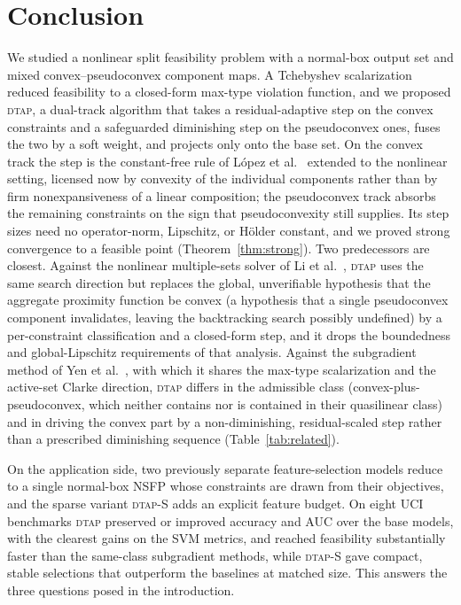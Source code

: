 \documentclass[]{interact}
\theoremstyle{plain}
\theoremstyle{definition}
\theoremstyle{remark}
\newcommand{\dtap}{\textsc{dtap}}
\begin{document}
\section{Conclusion}\label{sec:conclusion}
We studied a nonlinear split feasibility problem with a normal-box output set and mixed convex--pseudoconvex component maps. A Tchebyshev scalarization reduced feasibility to a closed-form max-type violation function, and we proposed \dtap, a dual-track algorithm that takes a residual-adaptive step on the convex constraints and a safeguarded diminishing step on the pseudoconvex ones, fuses the two by a soft weight, and projects only onto the base set. On the convex track the step is the constant-free rule of L\'opez et al.~\citep{lopez2012} extended to the nonlinear setting, licensed now by convexity of the individual components rather than by firm nonexpansiveness of a linear composition; the pseudoconvex track absorbs the remaining constraints on the sign that pseudoconvexity still supplies. Its step sizes need no operator-norm, Lipschitz, or H\"older constant, and we proved strong convergence to a feasible point (Theorem~\ref{thm:strong}). Two predecessors are closest. Against the nonlinear multiple-sets solver of Li et al.~\citep{li2013nsfp}, \dtap{} uses the same search direction but replaces the global, unverifiable hypothesis that the aggregate proximity function be convex (a hypothesis that a single pseudoconvex component invalidates, leaving the backtracking search possibly undefined) by a per-constraint classification and a closed-form step, and it drops the boundedness and global-Lipschitz requirements of that analysis. Against the subgradient method of Yen et al.~\citep{yen2019}, with which it shares the max-type scalarization and the active-set Clarke direction, \dtap{} differs in the admissible class (convex-plus-pseudoconvex, which neither contains nor is contained in their quasilinear class) and in driving the convex part by a non-diminishing, residual-scaled step rather than a prescribed diminishing sequence (Table~\ref{tab:related}).

On the application side, two previously separate feature-selection models reduce to a single normal-box NSFP whose constraints are drawn from their objectives, and the sparse variant \dtap-S adds an explicit feature budget. On eight UCI benchmarks \dtap{} preserved or improved accuracy and AUC over the base models, with the clearest gains on the SVM metrics, and reached feasibility substantially faster than the same-class subgradient methods, while \dtap-S gave compact, stable selections that outperform the baselines at matched size. This answers the three questions posed in the introduction.
\end{document}
